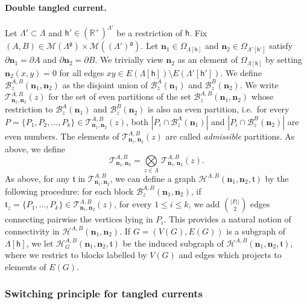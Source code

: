 \documentclass[11pt,a4paper]{article}
\theoremstyle{definition}
\numberwithin{equation}{section}
\newcommand\n{\mathbf{n}}
\newcommand\fg{\mathfrak{g}}
\newcommand\ft{\mathfrak{t}}
\begin{document}
\paragraph{Double tangled current.} Let $\Lambda'\subset \Lambda$ and $\mathsf{h}'\in(\mathbb R^+)^{\Lambda'}$ be a restriction of $\mathsf{h}$.
Fix $(A,B)\in \mathcal{M}(\Lambda^\fg)\times \mathcal{M}((\Lambda')^\fg)$. Let $\n_1 \in \Omega_{\Lambda[\mathsf{h}]}$ and $\n_2 \in \Omega_{\Lambda'[\mathsf{h}']}$ 
satisfy $\partial \n_1 = \partial A$ and $\partial \n_2 = \partial B$. We trivially view $\n_2$ as an element of 
$\Omega_{\Lambda[\mathsf{h}]}$ by setting $\n_2(x,y) = 0$ for all edges $xy\in E(\Lambda[\mathsf{h}])\setminus E(\Lambda'[\mathsf{h}'])$.  
We define $\mathcal{B}_z^{A,B}(\n_1,\n_2)$ as the disjoint union of $\mathcal{B}_z^{A}(\n_1)$ and $\mathcal{B}_z^{B}(\n_2)$.   
We write 
$\mathcal{T}_{\n_1,\n_2}^{A,B}(z)$ for the set of even partitions of the set $\mathcal{B}_z^{A,B}(\n_1,\n_2)$ whose restriction 
to $\mathcal{B}_z^A(\n_1)$ and $\mathcal{B}_z^B(\n_2)$ is also an even partition, i.e.\ for every $P=\{P_1,P_2,\ldots, P_k\}\in \mathcal{T}_{\n_1,\n_2}^{A,B}(z)$, both $|P_i\cap \mathcal{B}_z^A(\n_1)|$ and $|P_i \cap \mathcal{B}_z^B(\n_2)|$ are even numbers. The elements of $\mathcal{T}_{\n_1,\n_2}^{A,B}(z)$ are called {\it admissible} partitions.
As above, we define
\begin{equation}
\mathcal{T}^{A,B}_{\n_1,\n_2}
=
\underset{z \in \Lambda}{\bigotimes} \,\mathcal{T}^{A,B}_{\n_1,\n_2}(z).
\end{equation}
As above, for any $\ft$ in $\mathcal{T}_{\n_1,\n_2}
^{A,B}$, we can define a graph 
$\mathcal{H}^{A,B}(\n_1,\n_2,\ft)$ by the 
following procedure: for each block
$\mathcal{B}_z^{A,B}(\n_1,\n_2)$, if $\ft_z
=\{P_1,\ldots,P_k\}\in \mathcal{T}_{\n_1,\n_2}^{A,B}(z)$,
for every $1\leq i \leq k$, we add $\binom{|P_i|}{2}$ edges connecting pairwise the vertices lying in $P_i$. This provides a natural notion of connectivity in $\mathcal{H}^{A,B}(\n_1,\n_2)$.
If $G=(V(G),E(G))$ is a subgraph of $\Lambda[\mathsf{h}]$, we let $\mathcal{H}^{A,B}_{G}(\n_1,\n_2,\ft)$ be the induced subgraph of $\mathcal{H}^{A,B}(\n_1,\n_2,\ft)$, where we restrict to blocks labelled by $V(G)$ and edges which projects to elements of $E(G)$.



\subsubsection{Switching principle for tangled currents}
\end{document}
